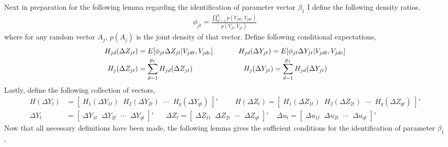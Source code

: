 \documentclass[10pt]{article}
\begin{document}
\noindent Next in preparation for the following lemma regarding the identification of parameter vector $\beta_1$ I define the following density ratios, 
\begin{align*} 
\phi_{jt} = \frac{ \prod_{d=1}^{p_1}p(V_{jdt},V_{jdc}) }{p(V_{jt},V_{jc})} 
\end{align*}
where for any random vector $A_{j}$, $p(A_{j})$ is the joint density of that vector. Define following conditional expectations, 
\begin{align*} 
H_{jd}(\Delta Z_{jt}) &= E[\phi_{jt} \Delta Z_{jt} |V_{jdt},V_{jdc}] \hspace{1.25cm} 
%
H_{jd}(\Delta Y_{jt}) = E[\phi_{jt} \Delta Y_{jt} |V_{jdt},V_{jdc}] \\
%
H_j(\Delta Z_{jt}) &= \sum_{d=1}^{p_1} H_{jd}(\Delta Z_{jt})  \hspace{2.5cm}
%
H_j(\Delta Y_{jt}) = \sum_{d=1}^{p_1} H_{jd}(\Delta Y_{jt})  \end{align*} 
Lastly, define the following collection of vectors, 
\begin{align*}
H(\Delta Y_t)  &= [ \; H_1(\Delta Y_{1t}) \;\; H_2(\Delta Y_{2t}) \;\; \cdots \;\; H_q(\Delta Y_{qt}) \; ]'
\hspace{1cm} 
H(\Delta Z_t)  = [ \; H_1(\Delta Z_{1t}) \;\; H_2(\Delta Z_{2t}) \;\; \cdots \;\; H_q(\Delta Z_{qt}) \; ]' \\
%
\Delta Y_t &= [ \; \Delta Y_{1t} \;\;  \Delta Y_{2t} \;\; \cdots \;\; \Delta Y_{qt} \;] '  \;\;\;\;\;\; \Delta Z_t = [ \; \Delta Z_{1t} \;\;  \Delta Z_{2t} \;\; \cdots \;\; \Delta Z_{qt} \;] ' 
\;\;\;\; \Delta u_t =  [ \; \Delta u_{1t} \;\;  \Delta u_{2t} \;\; \cdots \;\; \Delta u_{qt} \;] ' 
\end{align*}
Now that all necessary definitions have been made, the following lemma gives the sufficient conditions for the identification of parameter $\beta_1$, 
\end{document}
